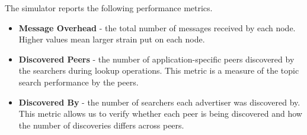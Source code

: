 
 The simulator reports the following performance metrics. 
 \begin{itemize}
     \item \textbf{Message Overhead} - the total number of messages received by each node. 
Higher values mean larger strain put on each node. 
     \item \textbf{Discovered Peers} - the number of application-specific peers discovered by the searchers during lookup operations. This metric is a measure of the topic search performance by the peers.
     \item \textbf{Discovered By} - the number of searchers each advertiser was discovered by. This metric allows us to verify whether each peer is being discovered and how the number of discoveries differs across peers.
 \end{itemize}
 
